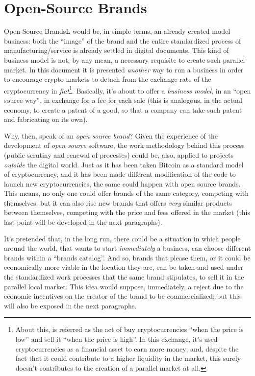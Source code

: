 \documentclass[12pt,a4paper]{article}
\begin{document}
\section{Open-Source Brands}
Open-Source BrandsL would be, in simple terms, an already created model business: both the “image” of the brand and the entire standardized process of manufacturing/service is already settled in digital documents. This kind of business model is not, by any mean, a necessary requisite to create such parallel market. In this document it is presented \textit{another} way to run a business in order to encourage crypto markets to detach from the exchange rate of the cryptocurrency in \textit{fiat}\footnote{About this, is referred as the act of buy cryptocurrencies “when the price is low” and sell it “when the price is high”. In this exchange, it's used cryptocurrencies as a financial asset to earn more money; and, despite the fact that it could contribute to a higher liquidity in the market, this surely doesn't contributes to the creation of a parallel market at all.}. Basically, it's about to offer a \textit{business model}, in an “open source way”, in exchange for a fee for each sale (this is analogous, in the actual economy, to create a patent of a good, so that a company can take such patent and fabricating on its own).

Why, then, speak of an \textit{open source brand}? Given the experience of the development of \textit{open source} software, the work methodology behind this process (public scrutiny and renewal of processes) could be, also, applied to projects \textit{outside} the digital world. Just as it has been taken Bitcoin as a standard model of cryptocurrency, and it has been made different modification of the code to launch new cryptocurrencies, the same could happen with open source brands. This means, no only one could offer brands of the same category, competing with themselves; but it can also rise new brands that offers \textit{very} similar products between themselves, competing with the price and fees offered in the market (this last point will be developed in the next paragraphs).

It's pretended that, in the long run, there could be a situation in which people around the world, that wants to start \textit{immediately} a business, can choose different brands within a “brands catalog”. And so, brands that please them, or it could be economically more viable in the location they are, can be taken and used under the standardized work processes that the same brand stipulates, to sell it in the parallel local market. This idea would suppose, immediately, a reject due to the economic incentives on the creator of the brand to be commercialized; but this will also be exposed in the next paragraphs.
\end{document}
